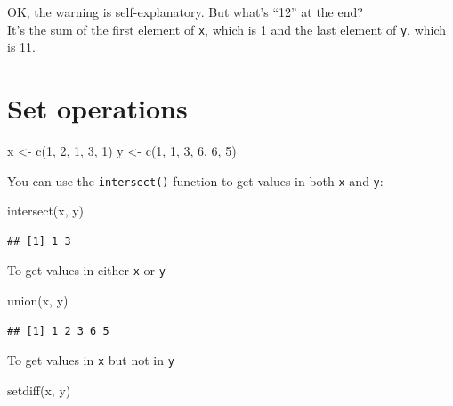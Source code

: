 \documentclass[
]{book}
\newenvironment{Shaded}{\begin{snugshade}}{\end{snugshade}}
\newcommand{\DecValTok}[1]{\textcolor[rgb]{0.00,0.00,0.81}{#1}}
\newcommand{\FunctionTok}[1]{\textcolor[rgb]{0.00,0.00,0.00}{#1}}
\newcommand{\NormalTok}[1]{#1}
\newcommand{\OtherTok}[1]{\textcolor[rgb]{0.56,0.35,0.01}{#1}}
\theoremstyle{definition}
\theoremstyle{definition}
\theoremstyle{definition}
\theoremstyle{definition}
\theoremstyle{remark}
\begin{document}
OK, the warning is self-explanatory. But what's ``12'' at the end?\\
It's the sum of the first element of \texttt{x}, which is 1 and the last element of \texttt{y}, which is 11.

\hypertarget{set-operations}{%
\section{Set operations}\label{set-operations}}

\begin{Shaded}
\begin{Highlighting}[]
\NormalTok{x }\OtherTok{\textless{}{-}} \FunctionTok{c}\NormalTok{(}\DecValTok{1}\NormalTok{, }\DecValTok{2}\NormalTok{, }\DecValTok{1}\NormalTok{, }\DecValTok{3}\NormalTok{, }\DecValTok{1}\NormalTok{)}
\NormalTok{y }\OtherTok{\textless{}{-}} \FunctionTok{c}\NormalTok{(}\DecValTok{1}\NormalTok{, }\DecValTok{1}\NormalTok{, }\DecValTok{3}\NormalTok{, }\DecValTok{6}\NormalTok{, }\DecValTok{6}\NormalTok{, }\DecValTok{5}\NormalTok{)}
\end{Highlighting}
\end{Shaded}

You can use the \texttt{intersect()} function to get values in both \texttt{x} and \texttt{y}:

\begin{Shaded}
\begin{Highlighting}[]
\FunctionTok{intersect}\NormalTok{(x, y)}
\end{Highlighting}
\end{Shaded}

\begin{verbatim}
## [1] 1 3
\end{verbatim}

To get values in either \texttt{x} or \texttt{y}

\begin{Shaded}
\begin{Highlighting}[]
\FunctionTok{union}\NormalTok{(x, y)}
\end{Highlighting}
\end{Shaded}

\begin{verbatim}
## [1] 1 2 3 6 5
\end{verbatim}

To get values in \texttt{x} but not in \texttt{y}

\begin{Shaded}
\begin{Highlighting}[]
\FunctionTok{setdiff}\NormalTok{(x, y)}
\end{Highlighting}
\end{Shaded}
\end{document}
